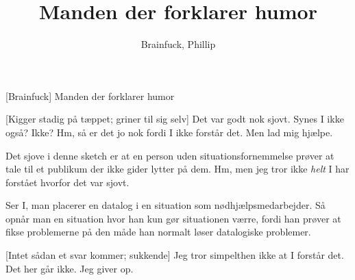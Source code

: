 \documentclass[a4paper,11pt]{article}
\title{Manden der forklarer humor}
\author{Brainfuck, Phillip}
\begin{document}
\maketitle

\begin{roles}
[Brainfuck] Manden der forklarer humor
\end{roles}
  
\begin{sketch}


[Kigger stadig på tæppet; griner til sig selv] Det var godt nok sjovt.  
 Synes I ikke også?  Ikke?  
Hm, så er det jo nok fordi I ikke forstår det.  Men lad mig hjælpe.

 Det sjove i denne sketch er at en person uden situationsfornemmelse
prøver at tale til et publikum der ikke gider lytter på dem.  Hm, men jeg
tror ikke \emph{helt} I har forstået hvorfor det var sjovt.

 Ser I, man placerer en datalog i en situation som
nødhjælpsmedarbejder.  Så opnår man en situation hvor han kun gør situationen
værre, fordi han prøver at fikse problemerne på den måde han normalt løser
datalogiske problemer. 

[Intet sådan et svar kommer; sukkende] Jeg tror simpelthen ikke at I
forstår det.  Det her går ikke.  Jeg giver op.


\end{sketch}
\end{document}
